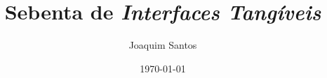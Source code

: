 	\title{Sebenta de \textit{Interfaces Tangíveis}}
\author{Joaquim Santos}
\date{\today}
\maketitle

\thispagestyle{empty}